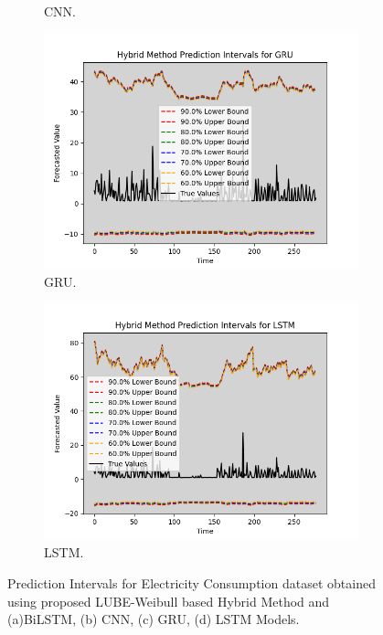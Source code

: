 \begin{figure}[H]
\begin{minipage}{0.45\textwidth}
\begin{subfigure}[b]{\textwidth}
            \caption{CNN.}
        \end{subfigure}
        \begin{subfigure}[b]{\textwidth}
            \centering
            \includegraphics[width=\textwidth]{Chap03/figs/GRU_hybrid_method_plot_Electricity_Consumption_Method2.png}
            \caption{GRU.}
        \end{subfigure}
        \begin{subfigure}[b]{\textwidth}
            \centering
            \includegraphics[width=\textwidth]{Chap03/figs/LSTM_hybrid_method_plot_Electricity_Consumption_Method2.png}
            \caption{LSTM.}
        \end{subfigure}
        \caption{Prediction Intervals for Electricity Consumption dataset obtained using proposed LUBE-Weibull based Hybrid Method and (a)BiLSTM, (b) CNN, (c) GRU, (d) LSTM Models.}
        \label{F 4.4}
    \end{minipage}
\end{figure}


